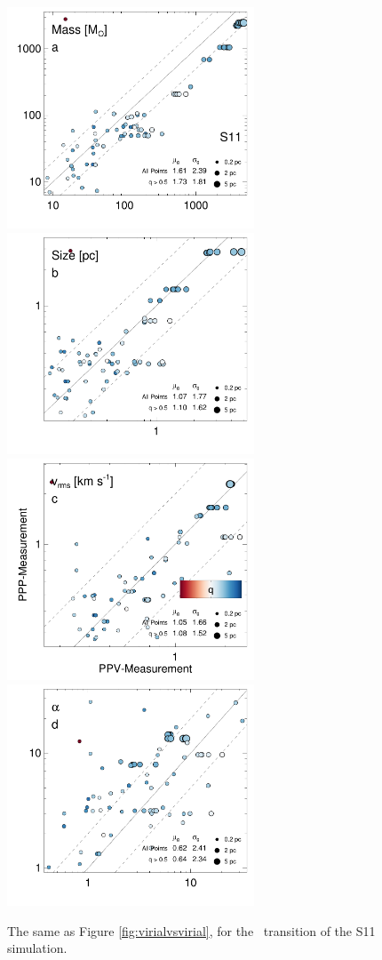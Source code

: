 \begin{figure}[htbp]
\includegraphics[width=2.9in]{figures/mass_rahul_13co}\hfill
\includegraphics[width=2.9in]{figures/size_rahul_13co}
\includegraphics[width=2.9in]{figures/vel_rahul_13co}\hfill
\includegraphics[width=2.9in]{figures/virial_rahul_13co}
\caption{The same as Figure \ref{fig:virialvsvirial}, for the \coc\, transition of the S11 simulation.}
\label{fig:virialvsvirial_rahul}
\end{figure}

